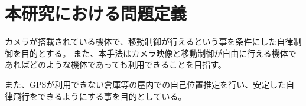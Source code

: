\chapter{本研究における問題定義}
\label{issue}
カメラが搭載されている機体で、移動制御が行えるという事を条件にした自律制御を目的とする。
また、本手法はカメラ映像と移動制御が自由に行える機体であればどのような機体であっても利用できることを目指す。

また、GPSが利用できない倉庫等の屋内での自己位置推定を行い、安定した自律飛行をできるようにする事を目的としている。



